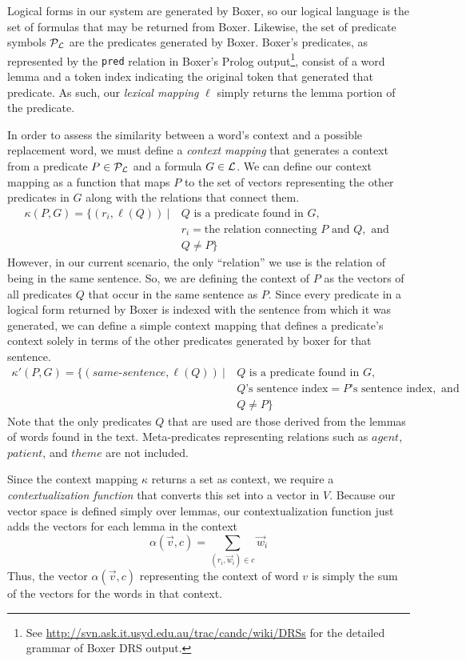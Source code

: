Logical forms in our system are generated by Boxer, so our logical language
\loglang is the set of formulas that may be returned from Boxer.  Likewise, the
set of predicate symbols ${\cal{P}}_{{\cal{L}}}$ are the predicates generated by
Boxer. Boxer's predicates, as represented by the {\tt pred} relation in Boxer's
Prolog output\footnote{See
\url{http://svn.ask.it.usyd.edu.au/trac/candc/wiki/DRSs} for the detailed
grammar of Boxer DRS output.}, consist of a word lemma and a token index
indicating the original token that generated that predicate.  As such, our 
\emph{lexical mapping} $\ell$ simply returns the lemma portion of the predicate.

In order to assess the similarity between a word's context and a possible
replacement word, we must define a \textit{context mapping} that generates a
context from a predicate $P \in {\cal{P}}_{{\cal{L}}}$ and a formula $G \in
{\cal{L}}$.  
We can define our context mapping as a function that maps $P$ to the set of
vectors representing the other predicates in $G$ along with the relations that
connect them.
\begin{align*}
\kappa(P,G) = \{ (r_i, \ell(Q)) ~| 
&~Q \text{ is a predicate found in } G, \\
&~r_i = \text{the relation connecting } P \text{ and } Q, \text{ and } \\
&~Q \neq P \}
\end{align*}
However, in our current scenario, the only ``relation'' we use is the relation
of being in the same sentence.  So, we are defining the context of $P$ as the
vectors of all predicates $Q$ that occur in the same sentence as $P$.
Since every predicate in a logical form returned by Boxer is indexed
with the sentence from which it was generated, we can define a simple context
mapping that defines a predicate's context solely in terms of the other
predicates generated by boxer for that sentence.
\begin{align*}
\kappa'(P,G) = \{ (same\text{-}sentence, \ell(Q)) ~|
&~Q \text{ is a predicate found in } G, \\
&~Q\text{'s sentence index} = P\text{'s sentence index}, \text{ and } \\
&~Q \neq P \}
\end{align*}
Note that the only predicates $Q$ that are used are those derived from the
lemmas of words found in the text.  Meta-predicates representing relations such
as $agent$, $patient$, and $theme$ are not included.

Since the context mapping $\kappa$ returns a set as context, we require a
\textit{contextualization function} that converts this set into a vector in $V$.
Because our vector space is defined simply over lemmas, our contextualization
function just adds the vectors for each lemma in the context \[ \alpha(\vec v,
c) = \sum_{(r_i, \vec w_i) \in c} \vec w_i \]  Thus, the vector $\alpha(\vec v,
c)$ representing the context of word $v$ is simply the sum of the vectors for
the words in that context.

